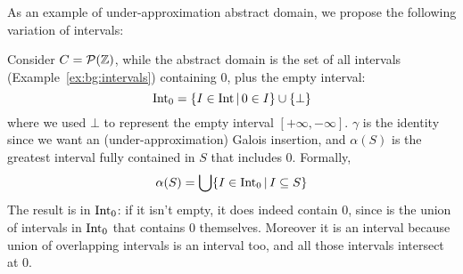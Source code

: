 As an example of under-approximation abstract domain, we propose the following variation of intervals:
\begin{example}\label{ex:bg:intervals0}
	Consider $C = \mathcal{P}(\mathbb{Z})$, while the abstract domain is the set of all intervals (Example~\ref{ex:bg:intervals}) containing $0$, plus the empty interval:
	\[
	\text{Int}_0 = \{ I \in \text{Int} \,\vert\, 0 \in I \} \cup \{ \bot \}
	\]
	where we used $\bot$ to represent the empty interval $[+\infty, -\infty]$.
	$\gamma$ is the identity since we want an (under-approximation) Galois insertion, and $\alpha(S)$ is the greatest interval fully contained in $S$ that includes $0$. Formally,
	\begin{align*}
		\alpha(S) = \bigcup \{ I \in \text{Int}_0 \,\vert\, I \subseteq S \}
	\end{align*}
	The result is in $\text{Int}_0$: if it isn't empty, it does indeed contain $0$, since is the union of intervals in $\text{Int}_0$ that contains $0$ themselves. Moreover it is an interval because union of overlapping intervals is an interval too, and all those intervals intersect at $0$.
\end{example}
